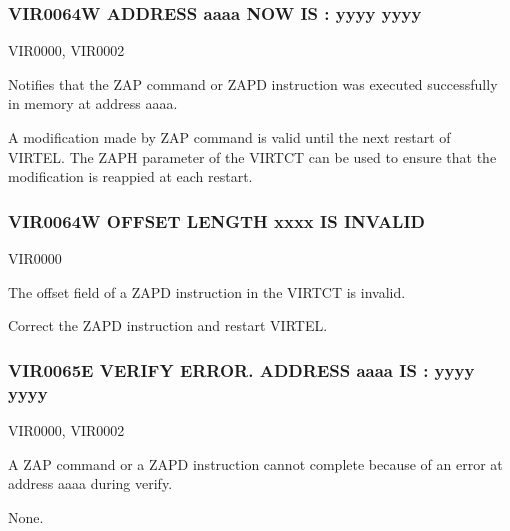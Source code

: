 \documentclass[letterpaper,10pt,english]{sphinxmanual}
\begin{document}
\subsubsection{VIR0064W ADDRESS aaaa NOW IS :  yyyy yyyy}
\label{\detokenize{messages:vir0064w-address-aaaa-now-is-yyyy-yyyy}}\begin{description}
\sphinxAtStartPar
VIR0000, VIR0002

\sphinxAtStartPar
Notifies that the ZAP command or ZAPD instruction was executed successfully in memory at address aaaa.

\sphinxAtStartPar
A modification made by ZAP command is valid until the next restart of VIRTEL. The ZAPH parameter of the VIRTCT can be used to ensure that the modification is reappied at each restart.

\end{description}


\subsubsection{VIR0064W OFFSET LENGTH xxxx IS INVALID}
\label{\detokenize{messages:vir0064w-offset-length-xxxx-is-invalid}}\begin{description}
\sphinxAtStartPar
VIR0000

\sphinxAtStartPar
The offset field of a ZAPD instruction in the VIRTCT is invalid.

\sphinxAtStartPar
Correct the ZAPD instruction and restart VIRTEL.

\end{description}


\subsubsection{VIR0065E VERIFY ERROR. ADDRESS aaaa IS : yyyy yyyy}
\label{\detokenize{messages:vir0065e-verify-error-address-aaaa-is-yyyy-yyyy}}\begin{description}
\sphinxAtStartPar
VIR0000, VIR0002

\sphinxAtStartPar
A ZAP command or a ZAPD instruction cannot complete because of an error at address aaaa during verify.

\sphinxAtStartPar
None.

\end{description}
\end{document}
